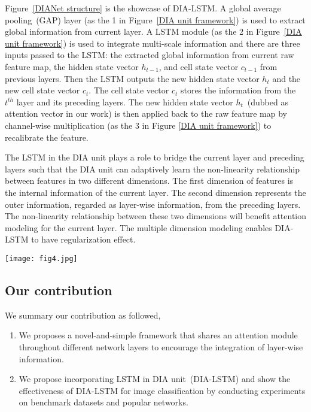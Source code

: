 \documentclass[letterpaper]{article} \usepackage{aaai20}  \usepackage{times}  \usepackage{helvet} \usepackage{courier}  \usepackage[hyphens]{url}  \usepackage{graphicx} \urlstyle{rm} \def\UrlFont{\rm}  \usepackage{graphicx}  \frenchspacing  \setlength{\pdfpagewidth}{8.5in}  \setlength{\pdfpageheight}{11in}  \usepackage{color}
\begin{document}
    Figure~\ref{DIANet structure} is the showcase of DIA-LSTM. A global average pooling~(GAP) layer (as the {\small{\textcircled{\tiny{1}}}} in Figure~\ref{DIA unit framework}) is used to extract global information from current layer. A LSTM module (as the {\small{\textcircled{\tiny{2}}}} in Figure~\ref{DIA unit framework}) is used to integrate multi-scale information and there are three inputs passed to the LSTM: the extracted global information from current raw feature map, the hidden state vector $h_{t-1}$, and cell state vector $c_{t-1}$ from previous layers. Then the LSTM outputs the new hidden state vector $h_{t}$ and the new cell state vector $c_{t}$. The cell state vector $c_{t}$ stores the information from the $t^{th}$ layer and its preceding layers. The new hidden state vector $h_{t}$~(dubbed as attention vector in our work) is then applied back to the raw feature map by channel-wise multiplication (as the {\small{\textcircled{\tiny{3}}}} in Figure \ref{DIA unit framework}) to recalibrate the feature. 
	
The LSTM in the DIA unit plays a role to bridge the current layer and preceding layers such that the DIA unit can adaptively learn the non-linearity relationship between features in two different dimensions. The first dimension of features is the internal information of the current layer. The second dimension represents the outer information, regarded as layer-wise information, from the preceding layers. The non-linearity relationship between these two dimensions will benefit attention modeling for the current layer. The multiple dimension modeling enables DIA-LSTM to have regularization effect.  
	\begin{figure*}[htbp]
		\centering
\texttt{[image: fig4.jpg]}
		\caption{The showcase of DIA-LSTM. In the LSTM cell, $c_t$ is the cell state vector and $h_t$ is the hidden state vector. GAP means global average pool over channels and $\otimes$ means channel-wise multiplication.}
		\label{DIANet structure}
	\end{figure*}
	\subsection{Our contribution}
	We summary our contribution as followed,
	\begin{enumerate}
	    \item We proposes a novel-and-simple framework that shares an attention module throughout different network layers to encourage the integration of layer-wise information.
	    \item We propose incorporating LSTM in DIA unit~(DIA-LSTM) and show the effectiveness of DIA-LSTM for image classification by conducting experiments on benchmark datasets and popular networks.
	\end{enumerate}
	
\end{document}
